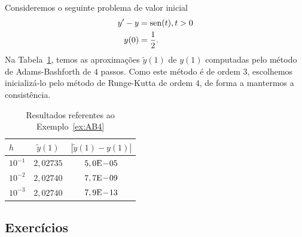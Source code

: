 \begin{ex}\label{ex:AB4}
  Consideremos o seguinte problema de valor inicial
  \begin{align}
    y' - y &= \operatorname{sen}(t), t>0\\
    y(0) &= \frac{1}{2}.
  \end{align}
  Na Tabela~\ref{tab:ex_AB4}, temos as aproximações $\tilde{y}(1)$ de $y(1)$ computadas pelo método de Adams-Bashforth de $4$ passos. Como este método é de ordem $3$, escolhemos inicializá-lo pelo método de Runge-Kutta de ordem $4$, de forma a mantermos a consistência.
 
  \begin{table}[h!]
    \centering
    \begin{tabular}{l|cc}
      $h$ & $\tilde{y}(1)$ & $|\tilde{y}(1)-y(1)|$\\\hline
      $10^{-1}$ & $2,02735$ & $5,0\mathrm{E}\!-\!05$ \\
      $10^{-2}$ & $2,02740$ & $7,7\mathrm{E}\!-\!09$ \\
      $10^{-3}$ & $2,02740$ & $7,9\mathrm{E}\!-\!13$ \\\hline
   \end{tabular}
    \caption{Resultados referentes ao Exemplo~\ref{ex:AB4}}
    \label{tab:ex_AB4}
  \end{table}






\end{ex}

\subsection*{Exercícios}

